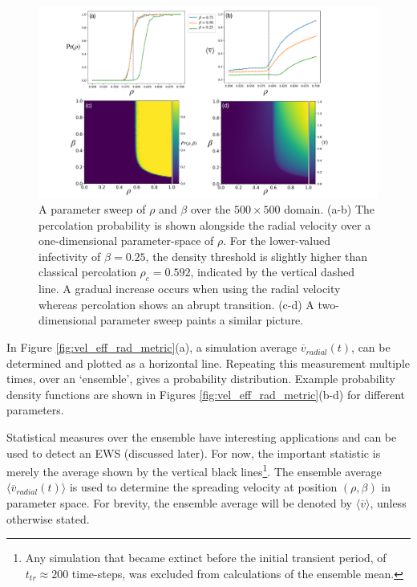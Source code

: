 \begin{figure}
    \centering
    \includegraphics[scale=0.325]{chapter3/figures/figure8_.pdf}
    \caption{A parameter sweep of $\rho$ and $\beta$ over the $500\times500$ domain. (a-b) The percolation probability is shown alongside the radial velocity over a one-dimensional parameter-space of $\rho$. For the lower-valued infectivity of $\beta=0.25$, the density threshold is slightly higher than classical percolation  $\rho_c=0.592$, indicated by the vertical dashed line. A gradual increase occurs when using the radial velocity whereas percolation shows an abrupt transition. (c-d) A two-dimensional parameter sweep  paints a similar picture.}
    \label{fig:slm_pspace}
\end{figure}

In Figure \ref{fig:vel_eff_rad_metric}(a), a simulation average $\overline{v}_{radial}(t)$, can be  determined and plotted as a horizontal line. %
Repeating this measurement multiple times, over an `ensemble', gives a probability distribution. %
Example  probability density functions are shown in Figures \ref{fig:vel_eff_rad_metric}(b-d) for different parameters.%

Statistical measures over the ensemble have interesting applications and can be used to detect an EWS (discussed later). %
For now, the important statistic is merely the average shown by the vertical black %
lines\footnote{Any simulation that became extinct before the initial transient period, %
of $t_{tr}\approx 200$ time-steps, was excluded from calculations of the ensemble mean.}. %
The ensemble average $\big\langle \overline{v}_{radial}(t) \big\rangle$ is used to determine the spreading velocity at position $(\rho, \beta)$ in parameter space. %
For brevity, the ensemble average will be denoted by $\big\langle\overline{v}\big\rangle$, unless otherwise stated. %


